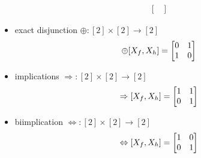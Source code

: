 \begin{example}
\begin{itemize}
\begin{align}
\begin{bmatrix}
			\end{bmatrix}
		\end{align}
	\item exact disjunction $\oplus:  [2]\times[2] \rightarrow[2]$	
		\begin{align}
			\oplus[X_{f},X_{h}]
			 = \begin{bmatrix}
			0 & 1 \\
			1 & 0 
			\end{bmatrix}
		\end{align}
	\item implications $\Rightarrow:  [2]\times[2] \rightarrow[2]$ 
		\begin{align}
			\Rightarrow[X_{f},X_{h}]
			 = \begin{bmatrix}
			1 & 1 \\
			0 & 1 
			\end{bmatrix}
		\end{align}
	\item biimplication $\Leftrightarrow:  [2]\times[2] \rightarrow[2]$ 
		\begin{align}
			\Leftrightarrow[X_{f},X_{h}]
			 = \begin{bmatrix}
			1 & 0 \\
			0 & 1 
			\end{bmatrix}
		\end{align}
	\end{itemize}

\end{example}
